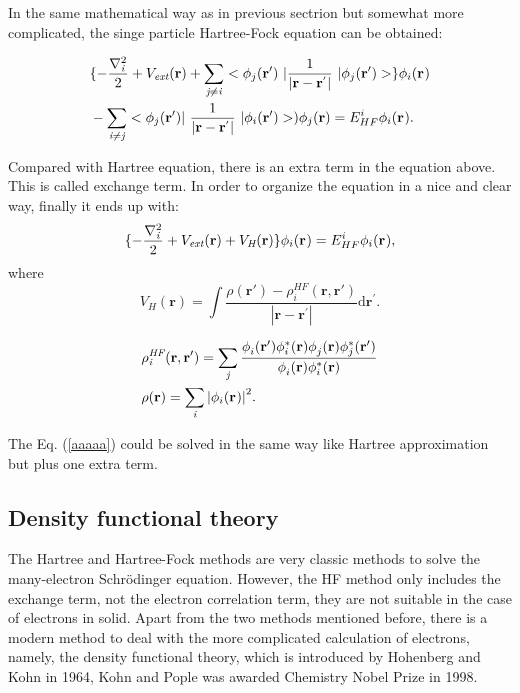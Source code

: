 \documentclass[a4paper, 12pt, titlepage,oneside,drop]{kthesis}
\begin{document}
\noindent In the same mathematical way as in previous sectrion but somewhat more complicated, the singe particle Hartree-Fock equation can be obtained:

\begin{equation}\begin{split}
& \{ -\frac{\nabla^{2}_{\textit i}}{2} + V_\textit{ext}(\textbf{r})+ \suminj<j><i> <\bwfn<j><'>\ | \frac{1}{|\textbf{r} - \textbf{r}^{'} |} \ | \bwfn<j><'>> \} \bwf<i><>  \\
& - \suminj<i><j>  < \bwfn<j><'>|\ \frac{1}{|\textbf{r} - \textbf{r}^{'} |} \ | \bwfn<i><'> >) \bwfn<j><>  = E^{i}_{HF} \bwf<i><>.
\end{split}\end{equation}

\noindent Compared with Hartree equation, there is an extra term in the equation above. This is called exchange term. In order to organize the equation in a nice and clear way, finally it ends up with:
\begin{equation}\label{aaaaa}\begin{split}
\{ -\frac{\nabla^{2}_{\textit i}}{2} + V_\textit{ext}(\textbf{r}) +V_\textit{H}(\textbf{r}) \}  \bwf<i><>  = E^{i}_{HF}   \bwf<i><>, 
\end{split}\end{equation}
where
\begin{equation}
 V_\textit{H}(\textbf{r})= \int \frac{\rho(\textbf{r}{'}) - \rho_{\textit{i}}^{\textit{HF}}(\textbf{r},\textbf{r}{'})}{|\textbf{r} - \textbf{r}^{'} |}  \mathrm{d}\textbf{r}^{'}.
\end{equation}

\begin{equation}
\begin{split}
& \rho_{\textit{i}}^{\textit{HF}}(\textbf{r},\textbf{r}{'}) = \sumi<j> \frac{\phi_{i}^{}(\textbf{r}{'}) \phi_{i}^{*}(\textbf{r}{}) \phi_{j}^{}(\textbf{r}{}) \phi_{j}^{*}(\textbf{r}{'})} {\phi_{i}^{}(\textbf{r}) \phi_{i}^{*}(\textbf{r})}  \\
& \rho(\textbf{r}) = \sumi<i>  {|\bwf<i><>|}^{2}.
\end{split}
\end{equation}

The Eq. (\ref{aaaaa}) could be solved in the same way like Hartree approximation but plus one extra term.

\subsection{Density functional theory}
\noindent The Hartree and Hartree-Fock methods are very classic methods to solve the many-electron 
 Schrödinger equation. However, the HF method only includes the exchange term, not the electron correlation term, they are not suitable in the case of electrons in solid.
 Apart from the two methods mentioned before, there is a modern method to deal with
 the more complicated calculation of electrons, namely, the density functional theory, which is introduced by Hohenberg and
 Kohn in 1964, Kohn and Pople was awarded Chemistry Nobel Prize in 1998.
\end{document}
